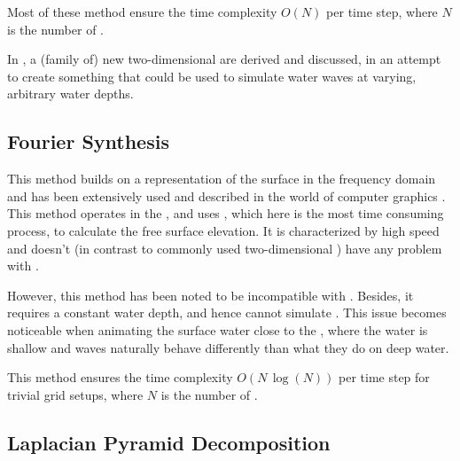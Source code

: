 Most of these method ensure the time complexity $O(N)$ per time step, where $N$ is the number of .

In , a (family of) new two-dimensional \PDEs are derived and discussed, in an attempt to create something that could be used to simulate water waves at varying, arbitrary water depths.

\subsection{Fourier Synthesis}

This method \citep{Mastin1987} builds on  a representation of the surface in the frequency domain and has been extensively used and described in the world of computer graphics \citep{Monnier}. This method operates in the , and uses \FFT, which here is the most time consuming process, to calculate the free surface elevation. It is characterized by high speed and doesn't (in contrast to commonly used two-dimensional \PDEs) have any problem with .

However, this method has been noted to be incompatible with \FSI \citep{Chentanez2011a}. Besides, it requires a constant water depth, and hence cannot simulate . This issue becomes noticeable when animating the surface water close to the , where the water is shallow and waves naturally behave differently than what they do on deep water.

This method ensures the time complexity $O(N\,\log(N))$ per time step for trivial grid setups, where $N$ is the number of .

\subsection{Laplacian Pyramid Decomposition}

